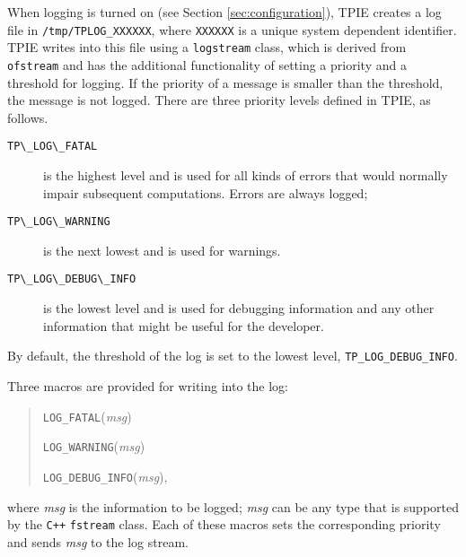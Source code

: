When logging is turned on (see Section \ref{sec:configuration}), TPIE
creates a log file in \verb|/tmp/TPLOG_XXXXXX|, where
\verb|XXXXXX| is a unique system dependent identifier. TPIE writes into
this file using a \verb|logstream| class, which is derived from
\verb|ofstream| and has the additional functionality of setting a priority
and a threshold for logging. If the priority of a message is smaller
than the threshold, the message is not logged. There are three priority
levels defined in TPIE, as follows.
\begin{description}
\item[\verb|TP\_LOG\_FATAL|] is the highest level and is used for all kinds
of errors that would normally impair subsequent computations. Errors are
always logged;
\item[\verb|TP\_LOG\_WARNING|] is the next lowest and is used for warnings.
\item[\verb|TP\_LOG\_DEBUG\_INFO|] is the lowest level and is used for debugging information and any other information that might be useful for the developer.
\end{description}
By default, the threshold of the log is set to the lowest level, \verb|TP_LOG_DEBUG_INFO|.

Three macros are provided for writing into the log:
\begin{quote}
\verb|LOG_FATAL|({\em msg})

\verb|LOG_WARNING|({\em msg})

\verb|LOG_DEBUG_INFO|({\em msg}),
\end{quote}
where {\em msg} is the information to be logged; {\em msg} can be any type
that is supported by the \verb|C++| \verb|fstream| class. Each of these
macros sets the corresponding priority and sends {\em msg} to the log
stream.





